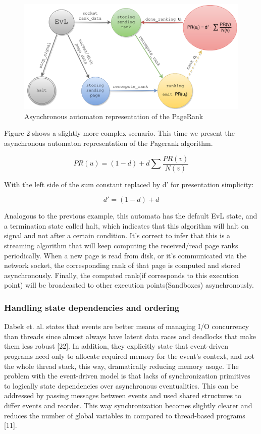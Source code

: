 \documentclass[10pt,reprint]{socc14}
\begin{document}
\begin{figure}	
	\centering
	\includegraphics[scale=0.5]{AutomatonPageRank}
	\caption{Asynchronous automaton representation of the PageRank}
\end{figure}


Figure 2 shows a slightly more complex scenario. This time we present the asynchronous automaton representation of the Pagerank algorithm. 

\begin{equation}
	PR(u) =(1-d) + d\sum \frac{PR(v)}{N(v)}
\end{equation}

With the left side of the sum constant replaced by d’ for presentation simplicity:

\begin{equation}
  d' =(1-d) + d
\end{equation}

Analogous to the previous example, this automata has the default EvL state, and a termination state called halt, which indicates that this algorithm will halt on signal and not after a certain condition. It’s correct to infer that this is a streaming algorithm that will keep computing the received/read page ranks periodically. When a new page is read from disk, or it’s communicated via the network socket, the corresponding rank of that page is computed and stored asynchronously. Finally, the computed rank(if corresponds to this execution point) will be broadcasted to other execution points(Sandboxes) asynchronously.

\subsubsection{Handling state dependencies and ordering}
Dabek et. al. states that events are better means of managing I/O concurrency than threads since almost always have latent data races and deadlocks that make them less robust [22]. In addition, they explicitly state that event-driven programs need only to allocate required memory for the event’s context, and not the whole thread stack, this way, dramatically reducing memory usage. The problem with the event-driven model is that lacks of synchronization primitives to logically state dependencies over asynchronous eventualities. This can be addressed by passing messages between events and used shared structures to differ events and reorder. This way synchronization becomes slightly clearer and reduces the number of global variables in compared to thread-based programs [11].
\end{document}
